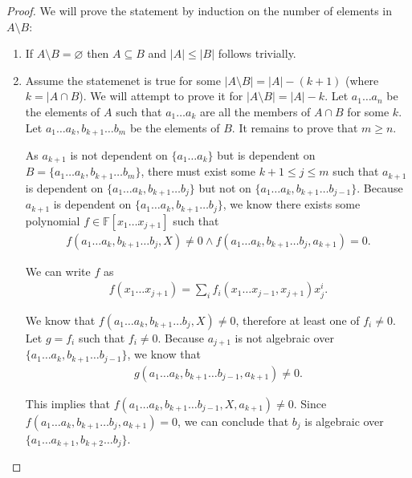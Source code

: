   \begin{proof}
    We will prove the statement by induction on the number of elements in $A \setminus B$:
    \begin{enumerate}
      \item If $A \setminus B = \varnothing $ then $A \subseteq B$ and $|A| \leq |B|$ follows trivially.
      \item Assume the statemenet is true for some $|A \setminus B| = |A| - (k + 1)$ (where $k = |A \cap B$). We will attempt to prove it for $|A \setminus B| = |A| - k$. Let $a _1 \ldots a _n$ be the elements of $A$ such that $a _1 \ldots a_k$ are all the members of $A \cap B$ for some $k$. Let $ a _1 \ldots a_k, b _{k + 1} \ldots b _m$ be the elements of $B$. It remains to prove that $m \geq n$.

        As $a _{k + 1}$ is not dependent on $\{a _1 \ldots a_k\}$ but is dependent on $B = \{a _1 \ldots a _k, b _{k + 1} \ldots b_m\}$, there must exist some $k + 1 \leq j \leq m$ such that $a _{k + 1}$ is dependent on $\{a _1 \ldots a _k, b _{k + 1} \ldots b_j\}$ but  not on $\{a _1 \ldots a _k, b _{k + 1} \ldots b _{j - 1}\}$. Because $a _{k + 1}$ is dependent on $\{a _1 \ldots a _k, b _{k + 1} \ldots b_j\}$, we know there exists some polynomial $f \in \mathbb F[x _1 \ldots x _{j + 1}]$ such that 
        \begin{align*}
           f(a _1 \ldots a _{k}, b _{k + 1} \ldots b _{j}, X) \neq  0 \land 
           f(a _1 \ldots a _{k}, b _{k + 1} \ldots b _{j}, a _{k + 1})  = 0.
        \end{align*}

      We can write $f$ as
      \begin{align*}
        f(x _1 \ldots x _{j + 1}) 
        = \sum_i f _i(x _1 \ldots x _{j - 1}, x _{j + 1}) x _j ^i.
      \end{align*}

        We know that $f(a _1 \ldots a _{k}, b _{k + 1} \ldots b _{j}, X) \neq  0$, therefore at least one of $f _i \neq 0$. Let $g = f _i $ such that $f _i \neq 0$. Because $a _{j + 1}$ is not algebraic over $\{a _1 \ldots a _k, b _{k + 1} \ldots b _{j - 1}\}$, we know that 
        \begin{align*}
          g(a _1 \ldots a _k, b _{k + 1} \ldots b _{j - 1}, a _{k + 1}) \neq 0.
        \end{align*}

        This implies that $f(a _1 \ldots a _k, b _{k + 1} \ldots b _{j - 1}, X, a _{k + 1}) \neq 0$. Since $ f(a _1 \ldots a _{k}, b _{k + 1} \ldots b _{j}, a _{k + 1})  = 0$, we can conclude that $b_j$ is algebraic over $\{a _1 \ldots a _{k + 1}, b _{k + 2} \ldots b _j\}$.


\end{enumerate}
\end{proof}
